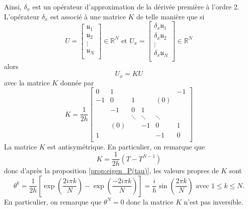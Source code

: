 Ainsi, $\delta_x$ est un opérateur d'approximation de la dérivée première à l'ordre 2. L'opérateur $\delta_x$ est associé à une matrice $K$ de telle manière que si 
\begin{equation}
U = \begin{bmatrix}
\mathfrak{u}_1\\
\mathfrak{u}_2\\
\vdots\\
\mathfrak{u}_{N}\\
\end{bmatrix} \in \mathbb{R}^N \text{ et } U_x = \begin{bmatrix}
\delta_x \mathfrak{u}_1\\
\delta_x \mathfrak{u}_2\\
\vdots\\
\delta_x \mathfrak{u}_{N}\\
\end{bmatrix} \in \mathbb{R}^N
\end{equation}
alors
\begin{equation}
U_x = K U
\end{equation}
avec la matrice $K$ donnée par
\begin{equation}
K = \dfrac{1}{2h} \begin{bmatrix}
0    & 1    &    &    &     & -1 \\
-1   & 0    & 1  &    & (0) &    \\
     & -1   & 0  & 1  &     &    \\
     &      & \ddots  & \ddots  & \ddots    &    \\
     & (0)  &    & -1 & 0   & 1  \\
1    &      &    &    & -1  & 0  \\
\end{bmatrix}
\end{equation}
La matrice $K$ est antisymétrique. En particulier, on remarque que 
\begin{equation}
K = \dfrac{1}{2h} \left( T - T^{N-1} \right)
\end{equation}
donc d'après la proposition \ref{prop:eigen_P(tau)}, les valeurs propres de $K$ sont 
\begin{equation}
\theta^k = \dfrac{1}{2h} \left[ \exp \left( \dfrac{2 i \pi k}{N} \right) - \exp \left( \dfrac{-2 i \pi k}{N} \right) \right] = \dfrac{i}{h} \sin \left( \dfrac{2 \pi k}{N} \right) \text{ avec } 1 \leq k \leq N.
\end{equation}
En particulier, on remarque que $\theta^N = 0$ donc la matrice $K$ n'est pas inversible.












